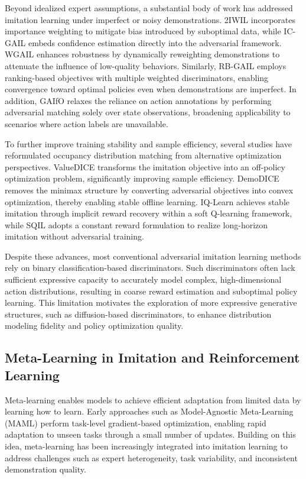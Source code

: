 \documentclass[lettersize,journal]{IEEEtran}
\begin{document}
Beyond idealized expert assumptions, a substantial body of work has addressed imitation learning under imperfect or noisy demonstrations. 2IWIL incorporates importance weighting to mitigate bias introduced by suboptimal data, while IC-GAIL embeds confidence estimation directly into the adversarial framework. WGAIL enhances robustness by dynamically reweighting demonstrations to attenuate the influence of low-quality behaviors. Similarly, RB-GAIL employs ranking-based objectives with multiple weighted discriminators, enabling convergence toward optimal policies even when demonstrations are imperfect. In addition, GAIfO relaxes the reliance on action annotations by performing adversarial matching solely over state observations, broadening applicability to scenarios where action labels are unavailable.

To further improve training stability and sample efficiency, several studies have reformulated occupancy distribution matching from alternative optimization perspectives. ValueDICE transforms the imitation objective into an off-policy optimization problem, significantly improving sample efficiency. DemoDICE removes the minimax structure by converting adversarial objectives into convex optimization, thereby enabling stable offline learning. IQ-Learn achieves stable imitation through implicit reward recovery within a soft Q-learning framework, while SQIL adopts a constant reward formulation to realize long-horizon imitation without adversarial training.

Despite these advances, most conventional adversarial imitation learning methods rely on binary classification-based discriminators. Such discriminators often lack sufficient expressive capacity to accurately model complex, high-dimensional action distributions, resulting in coarse reward estimation and suboptimal policy learning. This limitation motivates the exploration of more expressive generative structures, such as diffusion-based discriminators, to enhance distribution modeling fidelity and policy optimization quality.
\subsection{Meta-Learning in Imitation and Reinforcement Learning}
Meta-learning enables models to achieve efficient adaptation from limited data by learning how to learn. Early approaches such as Model-Agnostic Meta-Learning (MAML) perform task-level gradient-based optimization, enabling rapid adaptation to unseen tasks through a small number of updates. Building on this idea, meta-learning has been increasingly integrated into imitation learning to address challenges such as expert heterogeneity, task variability, and inconsistent demonstration quality.
\end{document}
